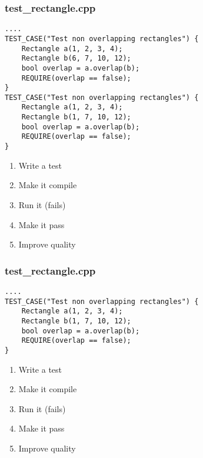 \begin{frame}[fragile]
\frametitle{test\_rectangle.cpp}
\begin{minipage}[t]{0.48\linewidth}
\begin{lstlisting}
....
TEST_CASE("Test non overlapping rectangles") {
    Rectangle a(1, 2, 3, 4);
    Rectangle b(6, 7, 10, 12);
    bool overlap = a.overlap(b);
    REQUIRE(overlap == false);
}
TEST_CASE("Test non overlapping rectangles") {
    Rectangle a(1, 2, 3, 4);
    Rectangle b(1, 7, 10, 12);
    bool overlap = a.overlap(b);
    REQUIRE(overlap == false);
}
\end{lstlisting}
\end{minipage}\hfill
\begin{minipage}[t]{0.28\linewidth}
  \small
  \begin{enumerate} 
    \item \textcolor{deadcolor}{Write a test}
    \item \textcolor{deadcolor}{Make it compile}
    \item \textcolor{deadcolor}{Run it (fails)}
    \item \textcolor{deadcolor}{Make it pass}
    \item \textcolor{activecolor}{Improve quality}
  \end{enumerate} 
\end{minipage}
\end{frame}


\begin{frame}[fragile]
\frametitle{test\_rectangle.cpp}
\begin{minipage}[t]{0.48\linewidth}
\begin{lstlisting}
....
TEST_CASE("Test non overlapping rectangles") {
    Rectangle a(1, 2, 3, 4);
    Rectangle b(1, 7, 10, 12);
    bool overlap = a.overlap(b);
    REQUIRE(overlap == false);
}
\end{lstlisting}
\end{minipage}\hfill
\begin{minipage}[t]{0.28\linewidth}
  \small
  \begin{enumerate} 
    \item \textcolor{activecolor}{Write a test}
    \item \textcolor{deadcolor}{Make it compile}
    \item \textcolor{deadcolor}{Run it (fails)}
    \item \textcolor{deadcolor}{Make it pass}
    \item \textcolor{deadcolor}{Improve quality}
  \end{enumerate} 
\end{minipage}
\end{frame}

